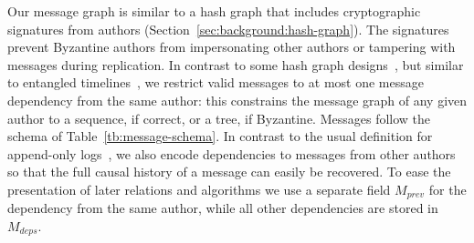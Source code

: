 \documentclass[9pt, oneside]{article}   	%
\begin{document}
Our message graph is similar to a hash graph that includes cryptographic signatures from authors (Section~\ref{sec:background:hash-graph}). The signatures prevent Byzantine authors from impersonating other authors or tampering with messages during replication. In contrast to some hash graph designs~\cite{kleppmann2020bec, Kleppmann2022byzantine, jacob2022bft-crdt}, but similar to entangled timelines~\cite{maniatis2002secure-timeline-entanglement}, we restrict valid messages to at most one message dependency from the same author: this constrains the message graph of any given author to a sequence, if correct, or a tree, if Byzantine. Messages follow the schema of Table~\ref{tb:message-schema}. In contrast to the usual definition for append-only logs~\cite{kermarrec2020gossiping}, we also encode dependencies to messages from other authors so that the full causal history of a message can easily be recovered. To ease the presentation of later relations and algorithms we use a separate field $M_\textit{prev}$ for the dependency from the same author, while all other dependencies are stored in $M_\textit{deps}$. 

\begin{table}[t]
\caption{Message schema.}
\label{tb:message-schema}
\end{table}
\end{document}

